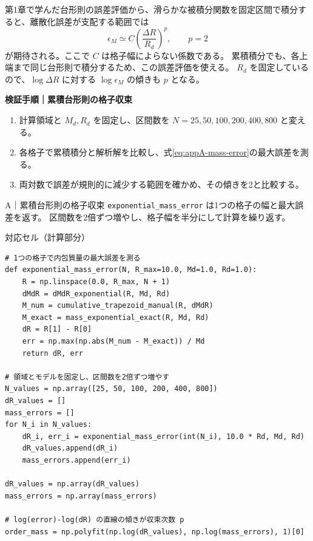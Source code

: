 第1章で学んだ台形則の誤差評価から、滑らかな被積分関数を固定区間で積分すると、離散化誤差が支配する範囲では
\begin{equation}
 \epsilon_M\simeq C\left(\frac{\Delta R}{R_d}\right)^p,\qquad p=2
\label{eq:appA-convergence-law}
\end{equation}
が期待される。ここで $C$ は格子幅によらない係数である。
累積積分でも、各上端まで同じ台形則で積分するため、この誤差評価を使える。
$R_d$ を固定しているので、$\log\Delta R$ に対する $\log\epsilon_M$ の傾きも $p$ となる。

\noindent\textbf{検証手順｜累積台形則の格子収束}
\begin{enumerate}
\item 計算領域と $M_d,R_d$ を固定し、区間数を $N=25,50,100,200,400,800$ と変える。
\item 各格子で累積積分と解析解を比較し、式\eqref{eq:appA-mass-error}の最大誤差を測る。
\item 両対数で誤差が規則的に減少する範囲を確かめ、その傾きを2と比較する。
\end{enumerate}

\begin{notebookblock}{A｜累積台形則の格子収束}
\texttt{exponential\_mass\_error} は1つの格子の幅と最大誤差を返す。
区間数を2倍ずつ増やし、格子幅を半分にして計算を繰り返す。

{\sffamily\small\color{graytext}対応セル（計算部分）}
\begin{Verbatim}[xleftmargin=2mm,fontsize=\footnotesize,frame=single,framesep=1.8mm,framerule=0.35pt,rulecolor=\color{listingframe},fillcolor=\color{listingbg}]
# 1つの格子で内包質量の最大誤差を測る
def exponential_mass_error(N, R_max=10.0, Md=1.0, Rd=1.0):
    R = np.linspace(0.0, R_max, N + 1)
    dMdR = dMdR_exponential(R, Md, Rd)
    M_num = cumulative_trapezoid_manual(R, dMdR)
    M_exact = mass_exponential_exact(R, Md, Rd)
    dR = R[1] - R[0]
    err = np.max(np.abs(M_num - M_exact)) / Md
    return dR, err

# 領域とモデルを固定し、区間数を2倍ずつ増やす
N_values = np.array([25, 50, 100, 200, 400, 800])
dR_values = []
mass_errors = []
for N_i in N_values:
    dR_i, err_i = exponential_mass_error(int(N_i), 10.0 * Rd, Md, Rd)
    dR_values.append(dR_i)
    mass_errors.append(err_i)

dR_values = np.array(dR_values)
mass_errors = np.array(mass_errors)

# log(error)-log(dR) の直線の傾きが収束次数 p
order_mass = np.polyfit(np.log(dR_values), np.log(mass_errors), 1)[0]
\end{Verbatim}
\end{notebookblock}


